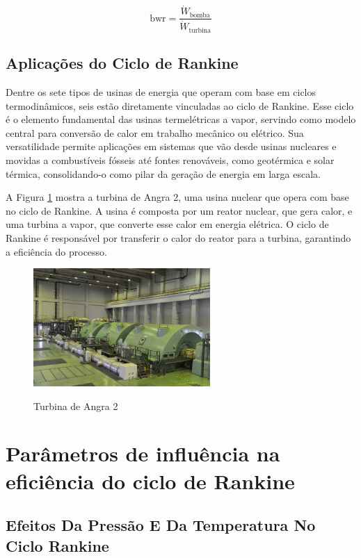 \documentclass[
	article,			%
	11pt,				%
	oneside,			%
	a4paper,			%
	english,			%
	brazil,				%
	sumario=tradicional
	]{abntex2}
\begin{document}
\begin{equation}
	\text{bwr} = \frac{\dot{W}_{\text{bomba}}}{\dot{W}_{\text{turbina}}}
	\label{eq:bwr}
\end{equation}

\subsection{Aplicações do Ciclo de Rankine}

Dentre os sete tipos de usinas de energia que operam com base em ciclos termodinâmicos, seis estão diretamente vinculadas ao ciclo de Rankine. Esse ciclo é o elemento fundamental das usinas termelétricas a vapor, servindo como modelo central para conversão de calor em trabalho mecânico ou elétrico. Sua versatilidade permite aplicações em sistemas que vão desde usinas nucleares e movidas a combustíveis fósseis até fontes renováveis, como geotérmica e solar térmica, consolidando-o como pilar da geração de energia em larga escala.

A Figura \ref{fig:etn} mostra a turbina de Angra 2, uma usina nuclear que opera com base no ciclo de Rankine. A usina é composta por um reator nuclear, que gera calor, e uma turbina a vapor, que converte esse calor em energia elétrica. O ciclo de Rankine é responsável por transferir o calor do reator para a turbina, garantindo a eficiência do processo.

\begin{figure}[h]
	\centering
	\includegraphics[width=0.6\textwidth]{./images/etn.jpg}
	\label{fig:etn}
	\caption{Turbina de Angra 2}
\end{figure}

\section{Parâmetros de influência na eficiência do ciclo de Rankine}

\subsection{Efeitos Da Pressão E Da Temperatura No Ciclo Rankine}
\end{document}
